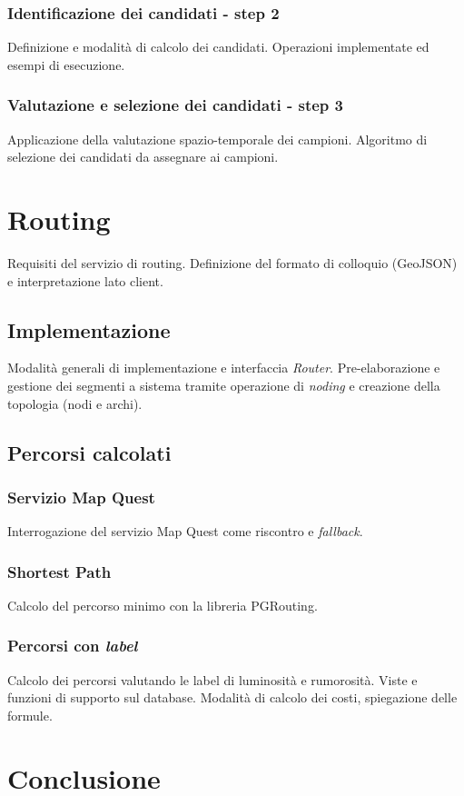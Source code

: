 \documentclass[a4paper, 12pt, twoside, openright]{book}
\begin{document}
\subsection{Identificazione dei candidati - step 2}
Definizione e modalità di calcolo dei candidati. Operazioni implementate ed esempi di esecuzione.
\subsection{Valutazione e selezione dei candidati - step 3}
Applicazione della valutazione spazio-temporale dei campioni. Algoritmo di selezione dei candidati da assegnare ai campioni. 

\chapter{Routing} %
Requisiti del servizio di routing. Definizione del formato di colloquio (GeoJSON) e interpretazione lato client.
\section{Implementazione}
Modalità generali di implementazione e interfaccia \emph{Router}.
Pre-elaborazione e gestione dei segmenti a sistema tramite operazione di \emph{noding} e creazione della topologia (nodi e archi).
\section{Percorsi calcolati}
\subsection{Servizio Map Quest}
Interrogazione del servizio Map Quest come riscontro e \emph{fallback}. 
\subsection{Shortest Path}
Calcolo del percorso minimo con la libreria PGRouting.
\subsection{Percorsi con \emph{label}}
Calcolo dei percorsi valutando le label di luminosità e rumorosità. Viste e funzioni di supporto sul database. Modalità di calcolo dei costi, spiegazione delle formule.

\chapter{Conclusione} %
\end{document}
